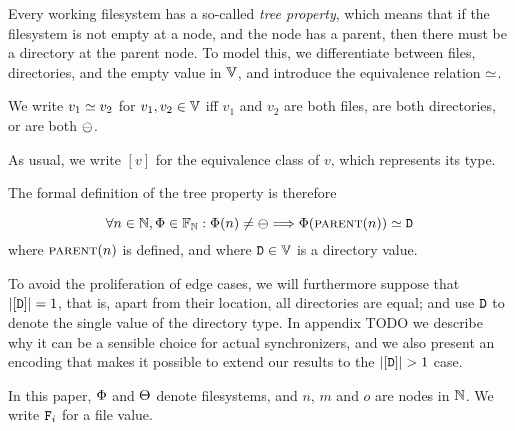 Every working filesystem has a so-called \emph{tree property}, which means that
if the filesystem is not empty at a node, and the node has a parent,
then there must be a directory at the parent node.
To model this, we differentiate between files, directories, and the
empty value in $\mathbb{V}$, and introduce the equivalence relation
$\simeq$.

\begin{mydef}
We write $v_1\simeq v_2$ for $v_1,v_2\in\mathbb{V}$ iff $v_1$ and $v_2$ are both files,
are both directories, or are both $\ominus$.
\end{mydef}

As usual, we write $[v]$ for the equivalence class of $v$, which represents its type.

The formal definition of the tree property is therefore
\begin{mydef}
\[ \forall n\in\mathbb{N}, \Phi\in\mathbb{F}_{\mathbb{N}}: \Phi(n) \neq \ominus \Longrightarrow \Phi(\text{\normalfont\scshape{parent}}(n)) \simeq \mathtt{D} \]
where $\text{\normalfont\scshape{parent}}(n)$ is defined, and where $\mathtt{D}\in\mathbb{V}$ is a directory value.
\end{mydef}

To avoid the proliferation of edge cases, we will furthermore suppose that
$|[\mathtt{D}]|=1$, that is, apart from their location, all directories are equal;
and use $\mathtt{D}$ to denote the single value of the directory type.
In appendix TODO we describe why it can be a sensible choice
for actual synchronizers, and we also present an encoding that makes it possible
to extend our results to the $|\setd|>1$ case.


In this paper, $\Phi$ and $\Theta$ denote filesystems,
and $n$, $m$ and $o$ are nodes in $\mathbb{N}$.
We write $\mathtt{F}_i$ for a file value. %

